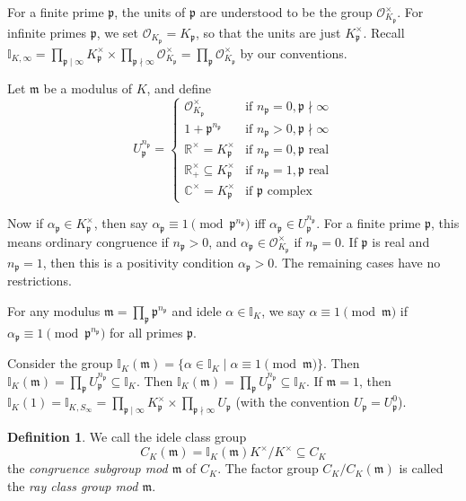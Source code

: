 \documentclass[11pt]{article}
\theoremstyle{definition}
\newtheorem{definition}{Definition}[section]
\theoremstyle{plain}
\theoremstyle{remark}
\newcommand{\II}{\mathbb{I}}
\newcommand{\RR}{\mathbb{R}}
\newcommand{\CC}{\mathbb{C}}
\newcommand{\cO}{\mathcal{O}}
\newcommand{\fp}{\mathfrak{p}}
\newcommand{\fm}{\mathfrak{m}}
\begin{document}
For a finite prime $\fp$, the units of $\fp$ are understood to be the group $\cO_{K_\fp}^\times$. For infinite primes $\fp$, we set $\cO_{K_\fp} = K_\fp$, so that the units are just $K_\fp^\times$. Recall $\II_{K, \infty} = \prod_{\fp \mid \infty} K_\fp^\times \times \prod_{\fp \nmid \infty} \cO_{K_\fp}^\times = \prod_\fp \cO_{K_\fp}^\times$ by our conventions.

Let $\fm$ be a modulus of $K$, and define
\begin{equation*}
    U_\fp^{n_\fp} =
    \begin{cases}
        \cO_{K_\fp}^\times & \text{if } n_\fp = 0, \fp \nmid \infty\\
        1 + \fp^{n_\fp} & \text{if } n_\fp > 0, \fp \nmid \infty\\
        \RR^\times = K_\fp^\times & \text{if } n_\fp = 0, \fp \text{ real}\\
        \RR_+^\times \subseteq K_\fp^\times & \text{if } n_\fp = 1, \fp \text{ real}\\
        \CC^\times = K_\fp^\times & \text{if } \fp \text{ complex}
    \end{cases}
\end{equation*}

Now if $\alpha_\fp \in K_\fp^\times$, then say $\alpha_\fp \equiv 1 \pmod{\fp^{n_\fp}}$ iff $\alpha_\fp \in U_\fp^{n_\fp}$. For a finite prime $\fp$, this means ordinary congruence if $n_\fp > 0$, and $\alpha_\fp \in \cO_{K_\fp}^\times$ if $n_\fp = 0$. If $\fp$ is real and $n_\fp = 1$, then this is a positivity condition $\alpha_\fp > 0$. The remaining cases have no restrictions.

For any modulus $\fm = \prod_\fp \fp^{n_\fp}$ and idele $\alpha \in \II_K$, we say $\alpha \equiv 1 \pmod{\fm}$ if $\alpha_\fp \equiv 1 \pmod{\fp^{n_\fp}}$ for all primes $\fp$.

Consider the group $\II_K(\fm) = \{\alpha \in \II_K \mid \alpha \equiv 1 \pmod{\fm}\}$. Then $\II_K(\fm) = \prod_{\fp} U_\fp^{n_\fp} \subseteq \II_K$. Then $\II_K(\fm) = \prod_\fp U_\fp^{n_\fp} \subseteq \II_K$. If $\fm = 1$, then $\II_K(1) = \II_{K,S_\infty} = \prod_{\fp \mid \infty} K_\fp^\times \times \prod_{\fp \nmid \infty} U_\fp$ (with the convention $U_\fp = U_\fp^0$).

\begin{definition}\label{def:9_16}
    We call the idele class group
    \begin{equation*}
        C_K(\fm) = \II_K(\fm) K^\times / K^\times \subseteq C_K
    \end{equation*}
    the \emph{congruence subgroup mod $\fm$} of $C_K$. The factor group $C_K / C_K(\fm)$ is called the \emph{ray class group mod $\fm$}.
\end{definition}
\end{document}
